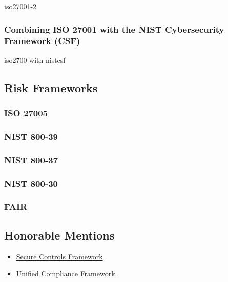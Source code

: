 \documentclass[12pt]{article}
\begin{document}
                                             {iso27001-2}
                              
                              \subsubsection{Combining ISO 27001 with the NIST Cybersecurity Framework (CSF)}
                              
                                             {iso2700-with-nistcsf}
                \subsection{Risk Frameworks}
                
                               \subsubsection{ISO 27005}
                               
                               \subsubsection{NIST 800-39}
                               
                               \subsubsection{NIST 800-37}
                               
                               \subsubsection{NIST 800-30}
                               
                               \subsubsection{FAIR}
                               
               \subsection{Honorable Mentions}                               
                                 
                                 \begin{itemize}
                                        \item \href{https://securecontrolsframework.com/start-here/}{Secure Controls Framework}
                                        \item \href{https://cms.unifiedcompliance.com/}{Unified Compliance Framework}
                                 \end{itemize}
                                 
\end{document}
